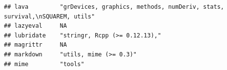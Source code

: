 \documentclass[]{article}
\begin{document}
\begin{verbatim}
## lava         "grDevices, graphics, methods, numDeriv, stats, survival,\nSQUAREM, utils"                                                                                                                                                                                                                                                                                                                                                                                                            
## lazyeval     NA                                                                                                                                                                                                                                                                                                                                                                                                                                                                                    
## lubridate    "stringr, Rcpp (>= 0.12.13),"                                                                                                                                                                                                                                                                                                                                                                                                                                                         
## magrittr     NA                                                                                                                                                                                                                                                                                                                                                                                                                                                                                    
## markdown     "utils, mime (>= 0.3)"                                                                                                                                                                                                                                                                                                                                                                                                                                                                
## mime         "tools"                                                                                                                                                                                                                                                                                                                                                                                                                                                                               

\end{verbatim}
\end{document}
